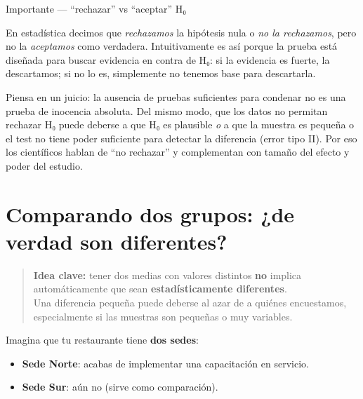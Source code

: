 \documentclass[
  spanish,
  letterpaper,
  DIV=11,
  numbers=noendperiod]{scrreprt}
\providecommand{\tightlist}{%
  \setlength{\itemsep}{0pt}\setlength{\parskip}{0pt}}
\begin{document}
\begin{tcolorbox}[enhanced jigsaw, toptitle=1mm, opacitybacktitle=0.6, leftrule=.75mm, arc=.35mm, title=\textcolor{quarto-callout-note-color}{\faInfo}\hspace{0.5em}{Nota}, colback=white, bottomrule=.15mm, colbacktitle=quarto-callout-note-color!10!white, opacityback=0, bottomtitle=1mm, breakable, rightrule=.15mm, coltitle=black, left=2mm, titlerule=0mm, colframe=quarto-callout-note-color-frame, toprule=.15mm]

Importante --- ``rechazar'' vs ``aceptar'' H₀

En estadística decimos que \emph{rechazamos} la hipótesis nula o
\emph{no la rechazamos}, pero no la \emph{aceptamos} como verdadera.
Intuitivamente es así porque la prueba está diseñada para buscar
evidencia en contra de H₀: si la evidencia es fuerte, la descartamos; si
no lo es, simplemente no tenemos base para descartarla.

Piensa en un juicio: la ausencia de pruebas suficientes para condenar no
es una prueba de inocencia absoluta. Del mismo modo, que los datos no
permitan rechazar H₀ puede deberse a que H₀ es plausible \emph{o} a que
la muestra es pequeña o el test no tiene poder suficiente para detectar
la diferencia (error tipo II). Por eso los científicos hablan de ``no
rechazar'' y complementan con tamaño del efecto y poder del estudio.

\end{tcolorbox}

\section{Comparando dos grupos: ¿de verdad son
diferentes?}\label{comparando-dos-grupos-de-verdad-son-diferentes}

\begin{quote}
\textbf{Idea clave:} tener dos medias con valores distintos \textbf{no}
implica automáticamente que sean \textbf{estadísticamente diferentes}.\\
Una diferencia pequeña puede deberse al azar de a quiénes encuestamos,
especialmente si las muestras son pequeñas o muy variables.
\end{quote}

Imagina que tu restaurante tiene \textbf{dos sedes}:

\begin{itemize}
\tightlist
\item
  \textbf{Sede Norte}: acabas de implementar una capacitación en
  servicio.
\item
  \textbf{Sede Sur}: aún no (sirve como comparación).
\end{itemize}
\end{document}
